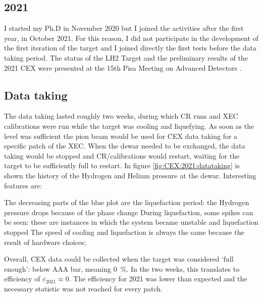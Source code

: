 \begin{refsection}
\section{2021}
    I started my Ph.D in November 2020 but I joined the activities after the first year, in October 2021. 
    For this reason, I did not participate in the development of the first iteration of the target and I joined directly the first tests before the data taking period.
    The status of the LH2 Target and the preliminary results of the 2021 CEX were presented at the 15th Pisa Meeting on Advanced Detectors \cite{Elba:mio}.

    \subsection{Data taking}
        The data taking lasted roughly two weeks, during which CR runs and XEC calibrations were run while the target was cooling and liquefying. 
        As soon as the level was sufficient the pion beam would be used for CEX data taking for a specific patch of the XEC.  
        When the dewar needed to be exchanged, the data taking would be stopped and CR/calibrations would restart, waiting for the target to be sufficiently full to restart.
        \noindent
        In figure \ref{fig:CEX:2021:datataking} is shown the history of the Hydrogen and Helium pressure at the dewar. 
        Interesting features are:
        \begin{outline}
            \1 The decreasing parts of the blue plot are the liquefaction period: the Hydrogen pressure drops because of the phase change
            \1 During liquefaction, some spikes can be seen: these are instances in which the system became unstable and liquefaction stopped
            \1 The speed of cooling and liquefaction is always the same because the result of hardware choices; 
        \end{outline}
        Overall, CEX data could be collected when the target was considered `full enough': below AAA bar, meaning \SI{0}{\%}. 
        In the two weeks, this translates to efficiency of $\varepsilon_{2021}\approx0$.
        The efficiency for 2021 was lower than expected and the necessary statistic was not reached for every patch.
        

\end{refsection}
